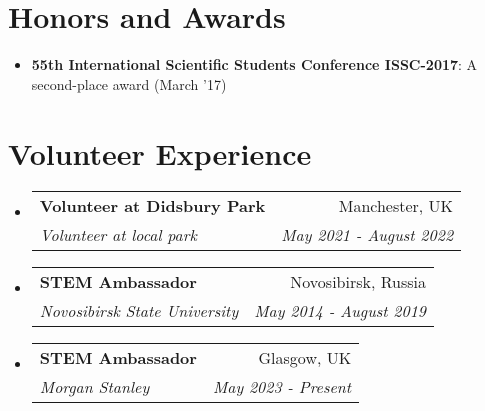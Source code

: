 \documentclass[a4paper,12pt]{extarticle}
\makeatletter
\newcommand{\resumeItem}[2]{
  \item\small{
    \textbf{#1}{: #2 \vspace{-2pt}}
  }
}
\newcommand{\resumeSubheading}[4]{
  \vspace{-1pt}\item
    \begin{tabular*}{0.97\textwidth}{l@{\extracolsep{\fill}}r}
      \textbf{#1} & #2 \\
      \textit{#3} & \textit{#4} \\
    \end{tabular*}\vspace{-5pt}
}
\newcommand{\resumeSubItem}[2]{\resumeItem{#1}{#2}\vspace{-3pt}}
\newcommand{\resumeSubHeadingListStart}{\begin{itemize}[leftmargin=*]}
\newcommand{\resumeSubHeadingListEnd}{\end{itemize}}
\makeatother
\begin{document}
\section{Honors and Awards}
\resumeSubHeadingListStart
\resumeSubItem{55th International Scientific Students Conference ISSC-2017}{A second-place award (March '17)}
\resumeSubHeadingListEnd

\vspace{-10pt}
\section{Volunteer Experience}
  \resumeSubHeadingListStart
	\resumeSubheading
    {Volunteer at Didsbury Park}{Manchester, UK}
    {Volunteer at local park}{May 2021 - August 2022}
	\resumeSubheading
    {STEM Ambassador}{Novosibirsk, Russia}
    {Novosibirsk State University}{May 2014 - August 2019}
  \resumeSubheading
    {STEM Ambassador}{Glasgow, UK}
    {Morgan Stanley}{May 2023 - Present}

\resumeSubHeadingListEnd
\end{document}
